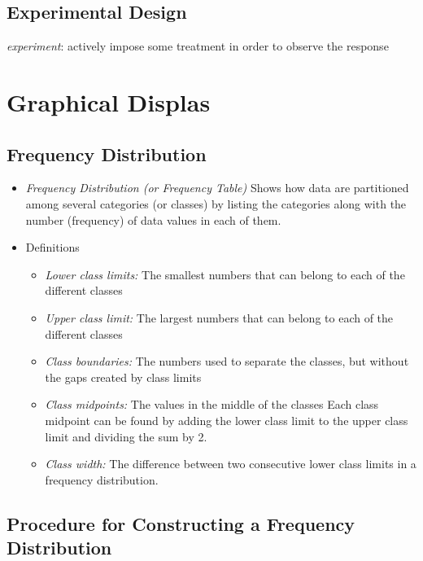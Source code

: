 \documentclass[]{book}
\providecommand{\tightlist}{%
  \setlength{\itemsep}{0pt}\setlength{\parskip}{0pt}}
\begin{document}
\hypertarget{experimental-design}{%
\section{Experimental Design}\label{experimental-design}}

\emph{experiment}: actively impose some treatment in order to observe the response

\hypertarget{graphical-displas}{%
\chapter{Graphical Displas}\label{graphical-displas}}

\hypertarget{frequency-distribution}{%
\section{Frequency Distribution}\label{frequency-distribution}}

\begin{itemize}
\item
  \emph{Frequency Distribution (or Frequency Table)}
  Shows how data are partitioned among several categories (or classes) by listing the categories along with the number (frequency) of data values in each of them.
\item
  Definitions

  \begin{itemize}
  \tightlist
  \item
    \emph{Lower class limits:} The smallest numbers that can belong to each of the different classes
  \item
    \emph{Upper class limit:} The largest numbers that can belong to each of the different classes\\
  \item
    \emph{Class boundaries:} The numbers used to separate the classes, but without the gaps created by class limits
  \item
    \emph{Class midpoints:} The values in the middle of the classes Each class midpoint can be found by adding the lower class limit to the upper class limit and dividing the sum by 2.
  \item
    \emph{Class width:} The difference between two consecutive lower class limits in a frequency distribution.
  \end{itemize}
\end{itemize}

\hypertarget{procedure-for-constructing-a-frequency-distribution}{%
\section{Procedure for Constructing a Frequency Distribution}\label{procedure-for-constructing-a-frequency-distribution}}
\end{document}
